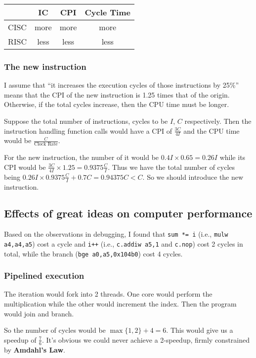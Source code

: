 \documentclass[12pt, a4paper]{article}
\begin{document}
\begin{table}[H]
\caption{}
\centering
\begin{tabular}{c||c|c|c}
 & IC & CPI & Cycle Time \\
\hline\hline
CISC & more & more & more \\
RISC & less & less & less
\end{tabular}
\label{tab:qualitative}
\end{table}

\subsubsection{The new instruction}

I assume that ``it increases the execution cycles of those instructions by
25\%'' means that the CPI of the new instruction is 1.25 times that of the origin. Otherwise, if the total cycles increase, then the CPU time must be longer.

Suppose the total number of instructions, cycles to be $I$, $C$ respectively.  Then the instruction handling function calls would have a CPI of $\frac{3C}{4I}$ and the CPU time would be $\frac{C}{\text{Clock Rate}}$.

For the new instruction, the number of it would be $0.4I\times0.65=0.26I$ while its CPI would be $\frac{3C}{4I}\times1.25=0.9375\frac{C}{I}$. Thus we have the total number of cycles being $0.26I\times0.9375\frac{C}{I}+0.7C=0.94375C<C$. So we should introduce the new instruction.

\subsection{Effects of great ideas on computer performance}

Based on the observations in debugging, I found that \texttt{sum *= i} (i.e., \texttt{mulw a4,a4,a5}) cost a cycle and \texttt{i++} (i.e., \texttt{c.addiw a5,1} and \texttt{c.nop}) cost 2 cycles in total, while the branch (\texttt{bge a0,a5,0x104b0}) cost 4 cycles.

\subsubsection{Pipelined execution}

The iteration would fork into 2 threads. One core would perform the multiplication while the other would increment the index. Then the program would join and branch.

So the number of cycles would be $\max\{1,2\}+4=6$. This would give us a speedup of $\frac{7}{6}$. It's obvious we could never achieve a 2-speedup, firmly constrained by \textbf{Amdahl's Law}.
\end{document}
